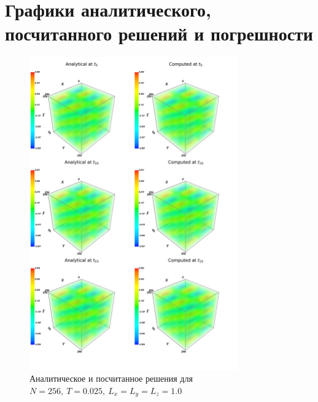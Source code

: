 \documentclass[oneside, final, 12pt]{extarticle}
\begin{document}
\section{Графики аналитического, посчитанного решений и погрешности}

\begin{figure}[H]
    \centering
    \includegraphics[width=0.8\textwidth]{cmp.png}
    \caption{Аналитическое и посчитанное решения для $ N = 256, \: T = 0.025, \: L_x = L_y = L_z = 1.0 $}
\end{figure}
\end{document}
